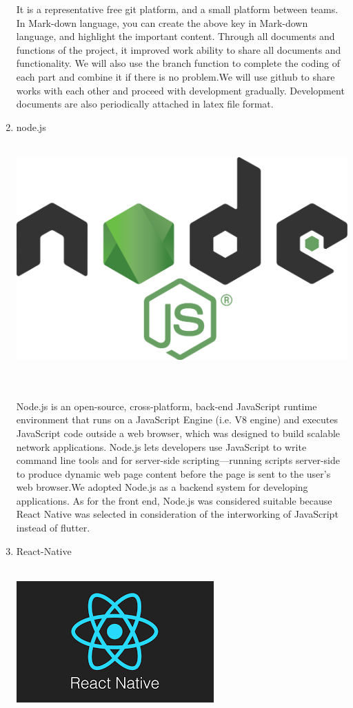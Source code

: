 \documentclass[conference]{IEEEtran}
\begin{document}
\begin{enumerate}
It is a representative free git platform, and a small platform between teams. In Mark-down language, you can create the above key in Mark-down language, and highlight the important content. Through all documents and functions of the project, it improved work ability to share all documents and functionality. We will also use the branch function to complete the coding of each part and combine it if there is no problem.We will use github to share works with each other and proceed with development gradually. Development documents are also periodically attached in latex file format.\\
	\item{node.js}\\
	\\
	\centerline{\includegraphics[scale=0.13]{pics/nodejs.png}}\\\\
Node.js is an open-source, cross-platform, back-end JavaScript runtime environment that runs on a JavaScript Engine (i.e. V8 engine) and executes JavaScript code outside a web browser, which was designed to build scalable network applications. Node.js lets developers use JavaScript to write command line tools and for server-side scripting—running scripts server-side to produce dynamic web page content before the page is sent to the user's web browser.We adopted Node.js as a backend system for developing applications. As for the front end, Node.js was considered suitable because React Native was selected in consideration of the interworking of JavaScript instead of flutter.\\
	\item{React-Native}\\
	\\
	\centerline{\includegraphics[scale=0.4]{pics/React-Native.png}}\\\\

\end{enumerate}
\end{document}
